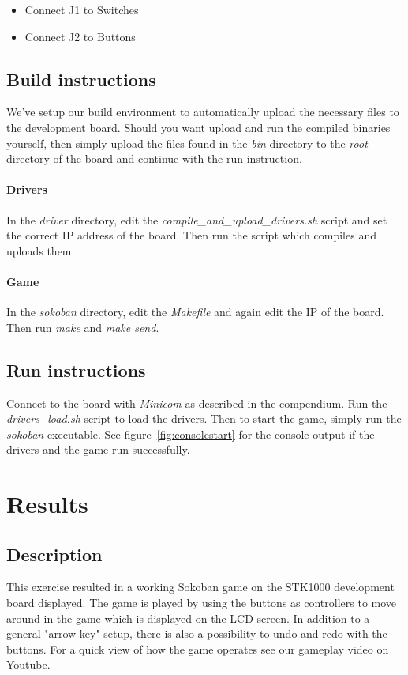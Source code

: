\documentclass[a4paper,11pt]{article}
\begin{document}
\begin{itemize}
\item Connect J1 to Switches
\item Connect J2 to Buttons
\end{itemize}

\subsection{Build instructions}
We've setup our build environment to automatically upload the necessary files to the development board. Should you want upload and run the compiled binaries yourself, then simply upload the files found in the \textit{bin} directory to the \textit{root} directory of the board and continue with the run instruction.

\paragraph{Drivers}
In the \textit{driver} directory, edit the \textit{compile\_and\_upload\_drivers.sh} script and set the correct IP address of the board. Then run the script which compiles and uploads them.

\paragraph{Game}
In the \textit{sokoban} directory, edit the \textit{Makefile} and again edit the IP of the board. Then run \textit{make} and \textit{make send}.

\subsection{Run instructions}
Connect to the board with \textit{Minicom} as described in the compendium. Run the \textit{drivers\_load.sh} script to load the drivers. Then to start the game, simply run the \textit{sokoban} executable. See figure~\ref{fig:consolestart} for the console output if the drivers and the game run successfully. 

\section{Results}
\subsection{Description} 
This exercise resulted in a working Sokoban game on the STK1000 development board displayed. The game is played by using the buttons as controllers to move around in the game which is displayed on the LCD screen. In addition to a general "arrow key" setup, there is also a possibility to undo and redo with the buttons. For a quick view of how the game operates see our gameplay video on Youtube\cite{youtube}.
\end{document}
